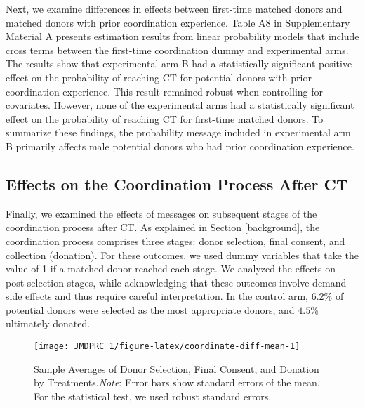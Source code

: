 \documentclass[12pt, a4paper]{article}
\begin{document}
Next, we examine differences in effects between first-time matched donors and matched donors with prior coordination experience. Table A8 in Supplementary Material A presents estimation results from linear probability models that include cross terms between the first-time coordination dummy and experimental arms. The results show that experimental arm B had a statistically significant positive effect on the probability of reaching CT for potential donors with prior coordination experience. This result remained robust when controlling for covariates. However, none of the experimental arms had a statistically significant effect on the probability of reaching CT for first-time matched donors. To summarize these findings, the probability message included in experimental arm B primarily affects male potential donors who had prior coordination experience.

\hypertarget{process}{%
\subsection{Effects on the Coordination Process After CT}\label{process}}

Finally, we examined the effects of messages on subsequent stages of the coordination process after CT. As explained in Section \ref{background}, the coordination process comprises three stages: donor selection, final consent, and collection (donation). For these outcomes, we used dummy variables that take the value of 1 if a matched donor reached each stage. We analyzed the effects on post-selection stages, while acknowledging that these outcomes involve demand-side effects and thus require careful interpretation. In the control arm, \(6.2\)\% of potential donors were selected as the most appropriate donors, and \(4.5\)\% ultimately donated.

\begin{figure}[t]
\texttt{[image: JMDPRC~1/figure-latex/coordinate-diff-mean-1]} \caption{Sample Averages of Donor Selection, Final Consent, and Donation by Treatments.\newline \emph{Note}: Error bars show standard errors of the mean. For the statistical test, we used robust standard errors.}\label{fig:coordinate-diff-mean}
\end{figure}
\end{document}
